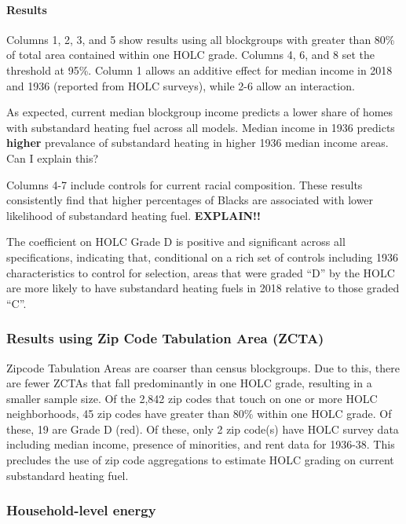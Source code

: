 \documentclass[
]{article}
\begin{document}
\hypertarget{results-1}{%
\paragraph{Results}\label{results-1}}

Columns 1, 2, 3, and 5 show results using all blockgroups with greater
than 80\% of total area contained within one HOLC grade. Columns 4, 6,
and 8 set the threshold at 95\%. Column 1 allows an additive effect for
median income in 2018 and 1936 (reported from HOLC surveys), while 2-6
allow an interaction.

As expected, current median blockgroup income predicts a lower share of
homes with substandard heating fuel across all models. Median income in
1936 predicts \textbf{higher} prevalance of substandard heating in
higher 1936 median income areas. Can I explain this?

Columns 4-7 include controls for current racial composition. These
results consistently find that higher percentages of Blacks are
associated with lower likelihood of substandard heating fuel.
\textbf{EXPLAIN!!}

The coefficient on HOLC Grade D is positive and significant across all
specifications, indicating that, conditional on a rich set of controls
including 1936 characteristics to control for selection, areas that were
graded ``D'' by the HOLC are more likely to have substandard heating
fuels in 2018 relative to those graded ``C''.

\hypertarget{results-using-zip-code-tabulation-area-zcta}{%
\subsubsection{Results using Zip Code Tabulation Area
(ZCTA)}\label{results-using-zip-code-tabulation-area-zcta}}

Zipcode Tabulation Areas are coarser than census blockgroups. Due to
this, there are fewer ZCTAs that fall predominantly in one HOLC grade,
resulting in a smaller sample size. Of the 2,842 zip codes that touch on
one or more HOLC neighborhoods, 45 zip codes have greater than 80\%
within one HOLC grade. Of these, 19 are Grade D (red). Of these, only 2
zip code(s) have HOLC survey data including median income, presence of
minorities, and rent data for 1936-38. This precludes the use of zip
code aggregations to estimate HOLC grading on current substandard
heating fuel.

\hypertarget{household-level-energy}{%
\subsubsection{Household-level energy}\label{household-level-energy}}
\end{document}

